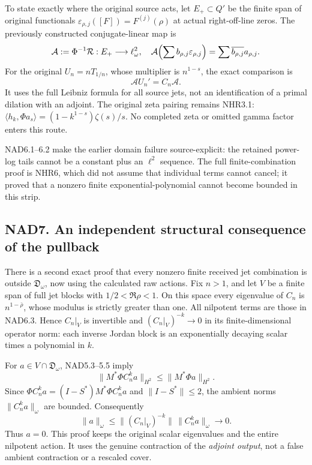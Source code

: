 To state exactly where the original source acts, let \(E_+\subset Q'\)
be the finite span of original functionals
\(\varepsilon_{\rho,j}([F])=F^{(j)}(\rho)\) at actual right-off-line
zeros. The previously constructed conjugate-linear map is \[
 \mathcal A:=\Phi^{-1}\mathcal R:E_+\longrightarrow\ell^2_\omega,
 \quad\mathcal A\Bigl(\sum b_{\rho,j}\varepsilon_{\rho,j}\Bigr)
       =\sum\overline{b_{\rho,j}}a_{\rho,j}.
\] For the original \(U_n=nT_{1/n}\), whose multiplier is \(n^{1-s}\),
the exact comparison is \[
 \boxed{\mathcal A U_n'=C_n\mathcal A.}
 \tag{NAD6.4}
\] It uses the full Leibniz formula for all source jets, not an
identification of a primal dilation with an adjoint. The original zeta
pairing remains NHR3.1:
\(\langle h_k,\Phi a_s\rangle=(1-k^{1-s})\zeta(s)/s\). No completed zeta
or omitted gamma factor enters this route.

NAD6.1--6.2 make the earlier domain failure source-explicit: the
retained power-log tails cannot be a constant plus an \(\ell^2\)
sequence. The full finite-combination proof is NHR6, which did not
assume that individual terms cannot cancel; it proved that a nonzero
finite exponential-polynomial cannot become bounded in this strip.

\subsection{NAD7. An independent structural consequence of the
pullback}\label{nad7.-an-independent-structural-consequence-of-the-pullback}

There is a second exact proof that every nonzero finite received jet
combination is outside \(\mathfrak D_\omega\), now using the calculated
raw actions. Fix \(n>1\), and let \(V\) be a finite span of full jet
blocks with \(1/2<\Re\rho<1\). On this space every eigenvalue of \(C_n\)
is \(n^{1-\bar\rho}\), whose modulus is strictly greater than one. All
nilpotent terms are those in NAD6.3. Hence \(C_n|_V\) is invertible and
\((C_n|_V)^{-k}\to0\) in its finite-dimensional operator norm: each
inverse Jordan block is an exponentially decaying scalar times a
polynomial in \(k\).

For \(a\in V\cap\mathfrak D_\omega\), NAD5.3--5.5 imply \[
 \|M^*\Phi C_n^k a\|_{H^2}\le\|M^*\Phi a\|_{H^2}.
\] Since \(\Phi C_n^k a=(I-S^*)M^*\Phi C_n^k a\) and \(\|I-S^*\|\le2\),
the ambient norms \(\|C_n^k a\|_\omega\) are bounded. Consequently \[
 \|a\|_\omega
 \le\|(C_n|_V)^{-k}\|\,\|C_n^k a\|_\omega\longrightarrow0.
\] Thus \(a=0\). This proof keeps the original scalar eigenvalues and
the entire nilpotent action. It uses the genuine contraction of the
\emph{adjoint output}, not a false ambient contraction or a rescaled
cover.

